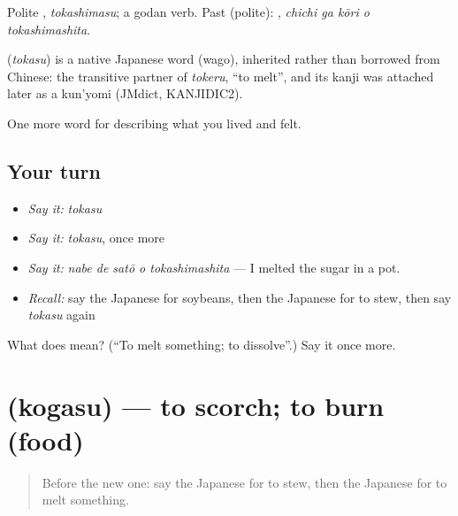 Polite \textbf{}, \emph{tokashimasu}; a godan verb. Past (polite): \textbf{  }, \emph{chichi ga kōri o tokashimashita}.

\begin{cousinweb}
\textbf{} (\emph{tokasu}) is a native Japanese word (wago), inherited rather than borrowed from Chinese: the transitive partner of \emph{tokeru}, \textquotedblleft{}to melt\textquotedblright{}, and its kanji was attached later as a kun'yomi (JMdict, KANJIDIC2).
\end{cousinweb}

\begin{grammarlens}[title={What you've built}]
One more word for describing what you lived and felt.
\end{grammarlens}

\subsection*{Your turn}
\begin{itemize}
\raggedright
  \item \emph{Say it:} \emph{tokasu}
  \item \emph{Say it:} \emph{tokasu}, once more
  \item \emph{Say it:} \emph{nabe de satō o tokashimashita} — I melted the sugar in a pot.
  \item \emph{Recall:} say the Japanese for soybeans, then the Japanese for to stew, then say \emph{tokasu} again
\end{itemize}

\begin{tcolorbox}[breakable,colback=teal!4,colframe=teal!35!black,title={Before you move on}]
What does  mean? (\textquotedblleft{}To melt something; to dissolve\textquotedblright{}.) Say it once more.
\end{tcolorbox}
\section[\texorpdfstring{\ja{こがす} (kogasu)}{こがす (kogasu)}]{ (kogasu) — to scorch; to burn (food)}

\label{lesson:JA-C473-kogasu}



\begin{quote}
Before the new one: say the Japanese for to stew, then the Japanese for to melt something.
\end{quote}

